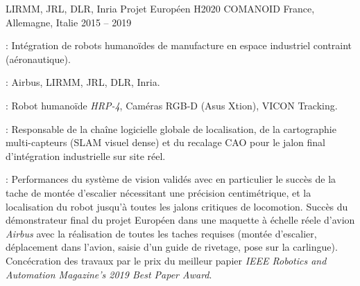 \begin{cventries}
  \cventry
    {LIRMM, JRL, DLR, Inria} %
    {Projet Européen H2020 COMANOID} %
    {France, Allemagne, Italie} %
    {2015 -- 2019} %
    {
      \begin{cvitems} 
        \item {} : Intégration de robots humanoïdes de manufacture en espace industriel contraint (aéronautique).
        \item {} : Airbus, LIRMM, JRL, DLR, Inria.
        \item {} : Robot humanoïde \emph{HRP-4}, Caméras RGB-D (Asus Xtion), VICON Tracking.
        \item {} : Responsable de la chaîne logicielle globale de localisation, de la cartographie multi-capteurs (SLAM visuel dense) et du recalage CAO pour le jalon final d'intégration industrielle sur site réel.
        \item {} : Performances du système de vision validés avec en particulier le succès de la tache de montée d'escalier nécessitant une précision centimétrique, et la localisation du robot jusqu'à toutes les jalons critiques de locomotion. Succès du démonstrateur final du projet Européen dans une maquette à échelle réele d'avion \emph{Airbus} avec la réalisation de toutes les taches requises (montée d'escalier, déplacement dans l'avion, saisie d'un guide de rivetage, pose sur la carlingue). Concécration des travaux par le prix du meilleur papier \emph{IEEE Robotics and Automation Magazine’s 2019 Best Paper Award}.
      \end{cvitems}
    }


\end{cventries}
